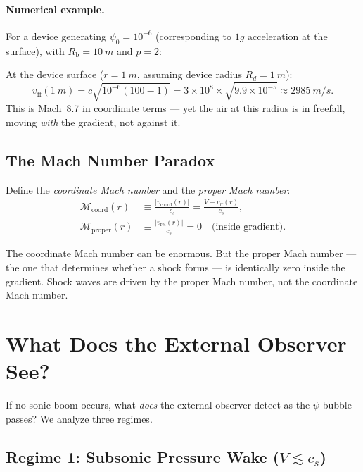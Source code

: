 \documentclass[12pt, letterpaper]{article}
\theoremstyle{definition}
\theoremstyle{remark}
\newcommand{\Rbub}{R_{\mathrm{b}}}
\newcommand{\cs}{c_s}
\newcommand{\Mach}{\mathcal{M}}
\begin{document}
\paragraph{Numerical example.}
For a device generating $\psi_0 = 10^{-6}$ (corresponding to $1g$ acceleration
at the surface), with $\Rbub = \SI{10}{m}$ and $p = 2$:

At the device surface ($r = \SI{1}{m}$, assuming device radius $R_d = \SI{1}{m}$):
\begin{equation}
v_{\mathrm{ff}}(\SI{1}{m}) = c\sqrt{10^{-6}(100 - 1)}
= 3 \times 10^8 \times \sqrt{9.9 \times 10^{-5}}
\approx \SI{2985}{m/s}.
\end{equation}
This is Mach~8.7 in coordinate terms --- yet the air at this radius is in
freefall, moving \emph{with} the gradient, not against it.

\subsection{The Mach Number Paradox}

Define the \emph{coordinate Mach number} and the \emph{proper Mach number}:
\begin{align}
\Mach_{\mathrm{coord}}(r) &\equiv \frac{|v_{\mathrm{coord}}(r)|}{\cs}
= \frac{V + v_{\mathrm{ff}}(r)}{\cs}, \label{eq:Mach-coord} \\
\Mach_{\mathrm{proper}}(r) &\equiv \frac{|v_{\mathrm{rel}}(r)|}{\cs}
= 0 \quad \text{(inside gradient)}.
\label{eq:Mach-proper}
\end{align}

The coordinate Mach number can be enormous. But the proper Mach number ---
the one that determines whether a shock forms --- is identically zero inside
the gradient. Shock waves are driven by the proper Mach number, not the
coordinate Mach number.

\section{What Does the External Observer See?}
\label{sec:observables}

If no sonic boom occurs, what \emph{does} the external observer detect as the
$\psi$-bubble passes? We analyze three regimes.

\subsection{Regime 1: Subsonic Pressure Wake ($V \lesssim \cs$)}
\end{document}
